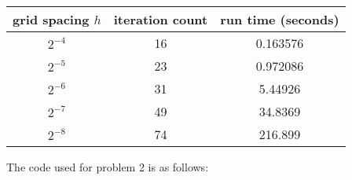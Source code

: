 \documentclass[12pt]{article}
\begin{document}
\begin{center}
\begin{tabular}{||c|c|c||}
\hline \hline
   grid spacing $h$ &   iteration count &   run time (seconds) \\
\hline \hline
       $2^{-4}$     &                16 &             0.163576 \\
       $2^{-5}$    &                23 &             0.972086 \\
       $2^{-6}$    &                31 &             5.44926  \\
       $2^{-7}$   &                49 &            34.8369   \\
       $2^{-8}$  &                74 &           216.899    \\
\hline \hline
\end{tabular}
\end{center}
The code used for problem 2 is as follows:
\end{document}
